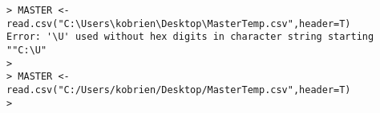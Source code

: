 \documentclass{beamer}
\begin{document}
\begin{frame}[fragile]
\begin{verbatim}
> MASTER <- read.csv("C:\Users\kobrien\Desktop\MasterTemp.csv",header=T)
Error: '\U' used without hex digits in character string starting ""C:\U"
> 
> MASTER <- read.csv("C:/Users/kobrien/Desktop/MasterTemp.csv",header=T)
> 

\end{verbatim}
\end{frame}
\end{document}
